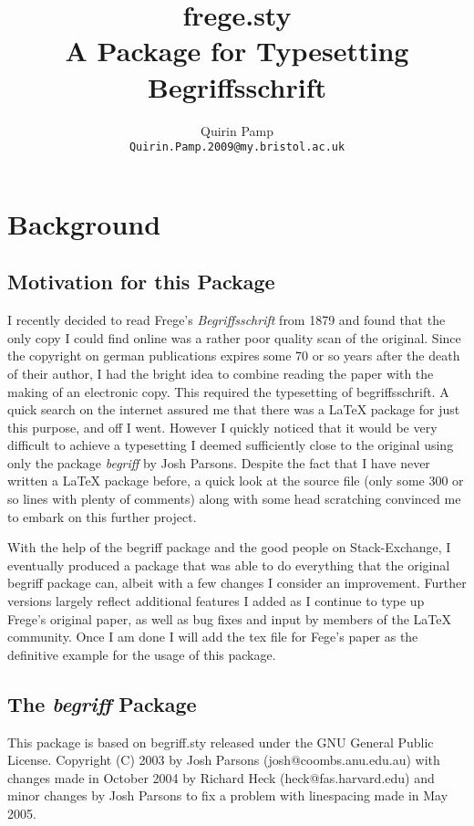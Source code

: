 \documentclass[12pt]{article}
\title{frege.sty \\ A \LaTeXe Package for Typesetting Begriffsschrift}
\author{Quirin Pamp \\ \texttt{Quirin.Pamp.2009@my.bristol.ac.uk}}
\begin{document}
\maketitle
\section{Background}
\subsection{Motivation for this Package}
  I recently decided to read Frege's \emph{Begriffsschrift} from 1879 and found that 
  the only copy I could find online was a rather poor quality scan of the original. 
  Since the copyright on german publications expires some 70 or so years after the 
  death of their author, I had the bright idea to combine reading the paper with 
  the making of an electronic copy. This required the typesetting of begriffsschrift.
  A quick search on the internet assured me that there was a LaTeX package for just 
  this purpose, and off I went. However I quickly noticed that it would be very 
  difficult to achieve a typesetting I deemed sufficiently close to the original 
  using only the package \emph{begriff} by Josh Parsons. Despite the fact that I 
  have never written a LaTeX package before, a quick look at the source file (only 
  some 300 or so lines with plenty of comments) along with some head scratching 
  convinced me to embark on this further project.

  With the help of the begriff package and the good people on Stack-Exchange, I 
  eventually produced a package that was able to do everything that the original 
  begriff package can, albeit with a few changes I consider an improvement. Further 
  versions largely reflect additional features I added as I continue to type up 
  Frege's original paper, as well as bug fixes and input by members of the LaTeX 
  community. Once I am done I will add the tex file for Fege's paper as the 
  definitive example for the usage of this package.

\subsection{The \emph{begriff} Package}
  This package is based on begriff.sty released under the GNU General Public 
  License. 
  Copyright (C) 2003 by Josh Parsons (josh@coombs.anu.edu.au) with changes made in 
  October 2004 by Richard Heck (heck@fas.harvard.edu) and minor changes by Josh 
  Parsons to fix a problem with linespacing made in May 2005.
\end{document}
